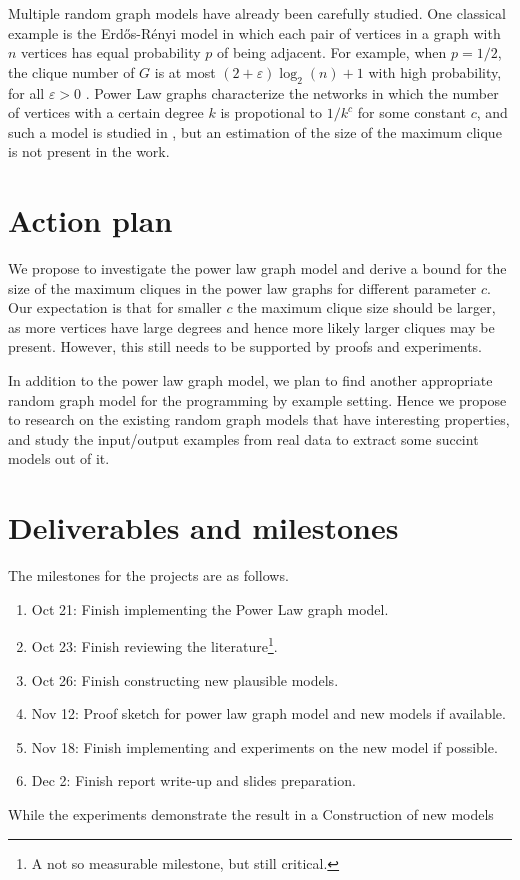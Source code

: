 \documentclass{article}
\begin{document}
Multiple random graph models have already been carefully studied. One classical example is the Erd\H{o}s-R\'enyi model \cite{erdos1960evolution} in which each pair of vertices in a graph with $n$ vertices has equal probability $p$ of being adjacent. For example, when $p = 1/2$, the clique number of $G$ is at most $(2 + \varepsilon)\log_2(n) + 1$ with high probability, for all $\varepsilon > 0$ \cite{danielSpielman}. Power Law graphs characterize the networks in which the number of vertices with a certain degree $k$ is propotional to $1/k^c$ for some constant $c$, and such a model is studied in \cite{aiello2000random}, but an estimation of the size of the maximum clique is not present in the work. 


\section{Action plan}
We propose to investigate the power law graph model and derive a bound for the size of the maximum cliques in the power law graphs for different parameter $c$. Our expectation is that for smaller $c$ the maximum clique size should be larger, as more vertices have large degrees and hence more likely larger cliques may be present. However, this still needs to be supported by proofs and experiments.

In addition to the power law graph model, we plan to find another appropriate random graph model for the programming by example setting. Hence we propose to research on the existing random graph models that have interesting properties\cite{easley2010networks}, and study the input/output examples from real data to extract some succint models out of it.


\section{Deliverables and milestones}
The milestones for the projects are as follows.
\begin{enumerate}
	\item Oct 21: Finish implementing the Power Law graph model.
	\item Oct 23: Finish reviewing the literature\footnote{A not so measurable milestone, but still critical.}.
	\item Oct 26: Finish constructing new plausible models.
	\item Nov 12: Proof sketch for power law graph model and new models if available.
	\item Nov 18: Finish implementing and experiments on the new model if possible.
	\item Dec 2: Finish report write-up and slides preparation.
\end{enumerate}

While the experiments demonstrate the result in a Construction of new models 


{}

\end{document}
